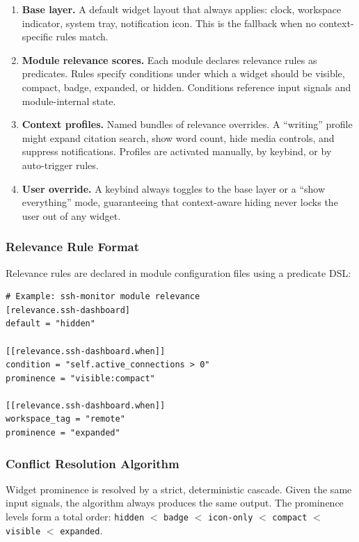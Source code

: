 \documentclass[11pt,a4paper]{article}
\begin{document}
\begin{enumerate}[leftmargin=1.5em, itemsep=4pt]
  \item \textbf{Base layer.} A default widget layout that always applies: clock, workspace indicator, system tray, notification icon. This is the fallback when no context-specific rules match.

  \item \textbf{Module relevance scores.} Each module declares relevance rules as predicates. Rules specify conditions under which a widget should be visible, compact, badge, expanded, or hidden. Conditions reference input signals and module-internal state.

  \item \textbf{Context profiles.} Named bundles of relevance overrides. A ``writing'' profile might expand citation search, show word count, hide media controls, and suppress notifications. Profiles are activated manually, by keybind, or by auto-trigger rules.

  \item \textbf{User override.} A keybind always toggles to the base layer or a ``show everything'' mode, guaranteeing that context-aware hiding never locks the user out of any widget.
\end{enumerate}

\subsubsection{Relevance Rule Format}

Relevance rules are declared in module configuration files using a predicate DSL:

\begin{lstlisting}[language={}]
# Example: ssh-monitor module relevance
[relevance.ssh-dashboard]
default = "hidden"

[[relevance.ssh-dashboard.when]]
condition = "self.active_connections > 0"
prominence = "visible:compact"

[[relevance.ssh-dashboard.when]]
workspace_tag = "remote"
prominence = "expanded"
\end{lstlisting}

\subsubsection{Conflict Resolution Algorithm}

Widget prominence is resolved by a strict, deterministic cascade. Given the same input signals, the algorithm always produces the same output. The prominence levels form a total order: \texttt{hidden} $<$ \texttt{badge} $<$ \texttt{icon-only} $<$ \texttt{compact} $<$ \texttt{visible} $<$ \texttt{expanded}.
\end{document}
